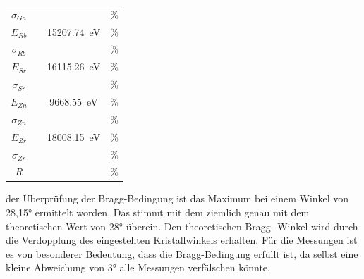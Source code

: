 \begin{table}[H]
\begin{tabular}{c c c c}
       $\sigma _{Ga} $ & \text{} & \text{} & \text{}\% \\
       $E_{Rb}$ & \text{} & \SI{15207.74}{\electronvolt}\cite{NIST} & \text{} \%\\
       $\sigma _{Rb} $ & \text{} & \text{} & \text{} \%\\
       $E_{Sr}$ & \text{} & \SI{16115.26}{\electronvolt}\cite{NIST} & \text{}\% \\
       $\sigma _{Sr} $ & \text{} & \text{} & \text{}\% \\
       $E_{Zn}$ & \text{} & \SI{9668.55}{\electronvolt}\cite{NIST} & \text{}\% \\
       $\sigma _{Zn} $ & \text{} & \text{} & \text{} \%\\
       $E_{Zr}$ & \text{} & \SI{18008.15}{\electronvolt}\cite{NIST} & \text{}\% \\
       $\sigma _{Zr} $ & \text{} & \text{} & \text{} \%\\
       $R$ & \text{} & \text{} & \text{}\% \\
    \bottomrule
\end{tabular}
\label{tab:9}
\end{table}

\justifying der Überprüfung der Bragg-Bedingung ist das Maximum bei einem Winkel von 28,15° ermittelt worden.
Das stimmt mit dem ziemlich genau mit dem theoretischen Wert von 28° überein. Den theoretischen Bragg-
Winkel wird durch die Verdopplung des eingestellten Kristallwinkels erhalten.
Für die Messungen ist es von besonderer Bedeutung, dass die Bragg-Bedingung erfüllt
ist, da selbst eine kleine Abweichung von 3° alle Messungen verfälschen könnte.\\

